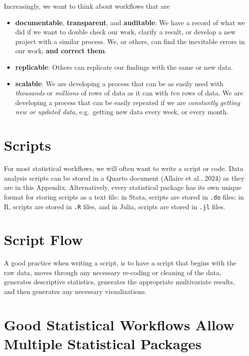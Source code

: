 \documentclass[
  letterpaper,
  DIV=11,
  numbers=noendperiod]{scrreprt}
\providecommand{\tightlist}{%
  \setlength{\itemsep}{0pt}\setlength{\parskip}{0pt}}\usepackage{longtable,booktabs,array}
\begin{document}
Increasingly, we want to think about workflows that are

\begin{itemize}
\tightlist
\item
  \textbf{documentable}, \textbf{transparent}, and \textbf{auditable}:
  We have a record of what we did if we want to double check our work,
  clarify a result, or develop a new project with a similar process. We,
  or others, can find the inevitable errors in our work, \textbf{and
  correct them}.
\item
  \textbf{replicable}: Others can replicate our findings with the same
  or new data.
\item
  \textbf{scalable}: We are developing a process that can be as easily
  used with \emph{thousands} or \emph{millions} of rows of data as it
  can with \emph{ten} rows of data. We are developing a process that can
  be easily repeated if we are \emph{constantly getting new or updated
  data}, e.g.~getting new data every week, or every month.
\end{itemize}

\section{Scripts}\label{scripts}

For most statistical workflows, we will often want to write a script or
code. Data analysis scripts can be stored in a Quarto document (Allaire
et al., 2024) as they are in this Appendix. Alternatively, every
statistical package has its own unique format for storing scripts as a
text file: in Stata, scripts are stored in \texttt{.do} files; in R,
scripts are stored in \texttt{.R} files, and in Julia, scripts are
stored in \texttt{.jl} files.

\section{Script Flow}\label{sec-script-flow}

A good practice when writing a script, is to have a script that begins
with the raw data, moves through any necessary re-coding or cleaning of
the data, generates descriptive statistics, generates the appropriate
multivariate results, and then generates any necessary visualizations.

\section{Good Statistical Workflows Allow Multiple Statistical
Packages}\label{sec-multiple-packages}
\end{document}
